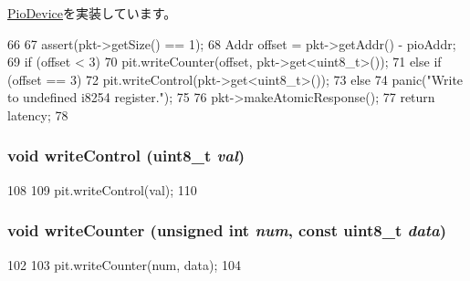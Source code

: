 \hyperlink{classPioDevice_afe8371668d023bb2516b286e5e399b6f}{PioDevice}を実装しています。


\begin{DoxyCode}
66 {
67     assert(pkt->getSize() == 1);
68     Addr offset = pkt->getAddr() - pioAddr;
69     if (offset < 3) {
70         pit.writeCounter(offset, pkt->get<uint8_t>());
71     } else if (offset == 3) {
72         pit.writeControl(pkt->get<uint8_t>());
73     } else {
74         panic("Write to undefined i8254 register.\n");
75     }
76     pkt->makeAtomicResponse();
77     return latency;
78 }
\end{DoxyCode}
\hypertarget{classX86ISA_1_1I8254_a7267b713581b4b13f0c1257103732da1}{
\subsubsection[{writeControl}]{\setlength{\rightskip}{0pt plus 5cm}void writeControl (uint8\_\-t {\em val})}}
\label{classX86ISA_1_1I8254_a7267b713581b4b13f0c1257103732da1}



\begin{DoxyCode}
108     {
109         pit.writeControl(val);
110     }
\end{DoxyCode}
\hypertarget{classX86ISA_1_1I8254_aa5af88439002d1cfeb0189113dfe4627}{
\subsubsection[{writeCounter}]{\setlength{\rightskip}{0pt plus 5cm}void writeCounter (unsigned int {\em num}, \/  const uint8\_\-t {\em data})}}
\label{classX86ISA_1_1I8254_aa5af88439002d1cfeb0189113dfe4627}



\begin{DoxyCode}
102     {
103         pit.writeCounter(num, data);
104     }
\end{DoxyCode}


